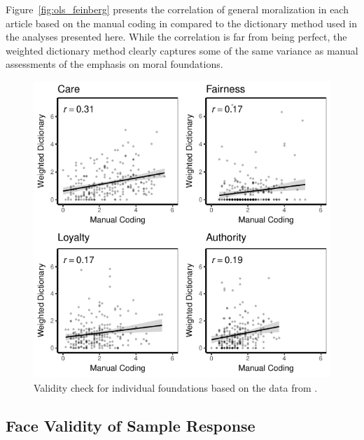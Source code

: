 \documentclass[12pt]{article}
\begin{document}
Figure~\ref{fig:ols_feinberg} presents the correlation of general moralization in each article based on the manual coding in \citet{feinberg2013moral} compared to the dictionary method used in the analyses presented here. While the correlation is far from being perfect, the weighted dictionary method clearly captures some of the same variance as manual assessments of the emphasis on moral foundations.


\begin{figure}[ht]\centering
\includegraphics{../calc/fig/feinberg_sep.pdf}
\caption{Validity check for individual foundations based on the data from \citet{feinberg2013moral}.}\label{fig:ols_feinberg_sep}
\end{figure}



\clearpage
\subsection{Face Validity of Sample Response}
\end{document}
